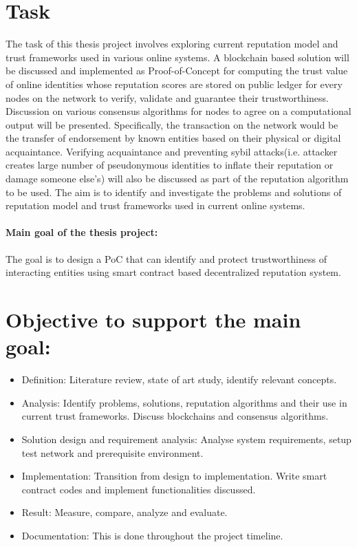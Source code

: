 \documentclass[a4paper,11pt,dvipsnames]{article}
\begin{document}
	\section*{Task}
	The task of this thesis project involves exploring current reputation 
	model and trust frameworks used in various online systems. A blockchain 
	based solution will be discussed and implemented as Proof-of-Concept for 
	computing the trust value of online identities whose reputation scores 
	are stored on public ledger for every nodes on the network to verify, 
	validate and guarantee their trustworthiness. Discussion on various 
	consensus algorithms for nodes to agree on a computational output will be
	presented. Specifically, the transaction on the network would be the transfer 
	of endorsement by known entities based on their physical or digital 
	acquaintance. Verifying acquaintance and preventing sybil
	attacks(i.e. attacker creates large number of pseudonymous identities 
	to inflate their reputation or damage someone else’s) will also be 
	discussed as part of the reputation algorithm to be used. The aim
	is to identify and investigate the problems and solutions of reputation 
	model and trust frameworks used in current online systems.
	
	\paragraph{Main goal of the thesis project: }
	 The goal is to design a PoC that can identify and protect 
	 trustworthiness of interacting entities using smart contract 
	 based decentralized reputation system.	
	
	\section*{Objective to support the main goal: }
	\begin{itemize}
		\item Definition: Literature review, state of art study, 
			identify relevant concepts.
		\item Analysis: Identify problems, solutions, reputation algorithms 
			and their use in current trust frameworks. Discuss blockchains 
			and consensus algorithms.
		\item Solution design and requirement analysis: Analyse system 
			requirements, setup test network and prerequisite environment.
		\item Implementation: Transition from design to implementation. Write 
			smart contract codes and implement functionalities discussed.
		\item Result: Measure, compare, analyze and evaluate.
		\item Documentation: This is done throughout the project timeline.
	\end{itemize}
\end{document}
